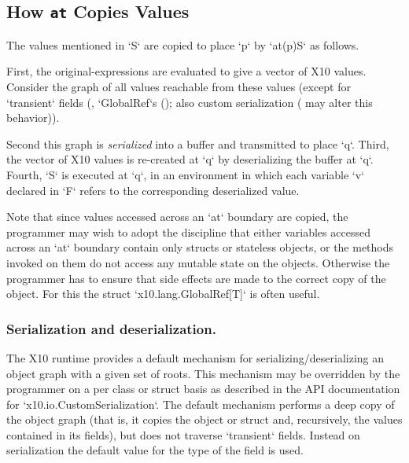 \subsection{How {\tt at} Copies Values}
\label{sect:at-init-val}


The values mentioned in \xcd`S` are copied to place \xcd`p` by \xcd`at(p)S` as follows.

First, the original-expressions are evaluated to give a vector of X10 values.
Consider the graph of all values reachable from these values (except for 
\xcd`transient` fields 
(, \xcd`GlobalRef`s (); also custom
serialization ( may alter this behavior)). 

Second this graph is {\em
serialized} into a buffer and transmitted to place \xcd`q`.  Third,
the vector of X10 values is 
re-created at \xcd`q` 
by deserializing the buffer at
\xcd`q`. Fourth, \xcd`S` is executed at \xcd`q`, in an environment in
which each variable \xcd`v` declared in \xcd`F` 
refers to the corresponding deserialized value.  

Note that since values accessed across an \xcd`at` boundary are
copied, the programmer may wish to adopt the discipline that either
variables accessed across an \xcd`at` boundary  contain only structs 
or stateless objects, or the methods invoked on them do not access any
mutable state on the objects. Otherwise the programmer has to ensure
that side effects are made to the correct copy of the object. For this
the struct \xcd`x10.lang.GlobalRef[T]` is often useful.


\subsubsection{Serialization and deserialization.}
\label{sect:ser+deser}
The X10 runtime provides a default mechanism for
serializing/deserializing an object graph with a given set of roots.
This mechanism may be overridden by the programmer on a per class or
struct basis as described in the API documentation for
\xcd`x10.io.CustomSerialization`.  
The default mechanism performs a
deep copy of the object graph (that is, it copies the object or struct
and, recursively, the values contained in its fields), but does not
traverse \xcd`transient` fields. Instead on serialization the default
value  for the type of the field is used.

